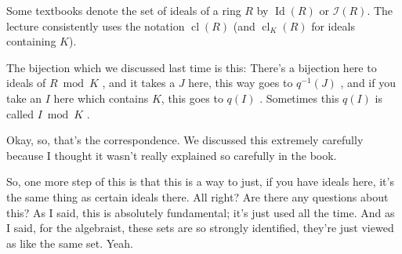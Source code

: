 \begin{aiNote}
Some textbooks denote the set of ideals of a ring $R$ by $\operatorname{Id}(R)$ or $\mathcal{I}(R)$. The lecture consistently uses the notation $\operatorname{cl}(R)$ (and $\operatorname{cl}_K(R)$ for ideals containing $K$).
\end{aiNote}

\begin{speech}[00:01:36 - 00:02:37]
The bijection which we discussed last time is this: There's a bijection here to ideals of $R \bmod K$ , and it takes a $J$ here, this way goes to $q^{-1}(J)$ , and if you take an $I$ here which contains $K$, this goes to $q(I)$ . Sometimes this $q(I)$ is called $I \bmod K$ .

Okay, so, that's the correspondence. We discussed this extremely carefully because I thought it wasn't really explained so carefully in the book.

So, one more step of this is that this is a way to just, if you have ideals here, it's the same thing as certain ideals there. All right? Are there any questions about this? As I said, this is absolutely fundamental; it's just used all the time. And as I said, for the algebraist, these sets are so strongly identified, they're just viewed as like the same set. Yeah.
\end{speech}


